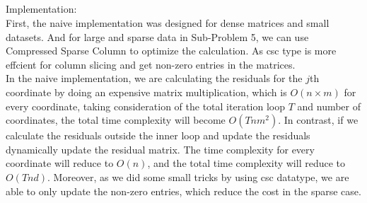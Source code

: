 \documentclass{article}
\begin{document}
\subsection{}
Implementation: \\
First, the naive implementation was designed for dense matrices and small datasets. And for large and sparse data in Sub-Problem 5, we can use Compressed Sparse Column to optimize the calculation. As csc type is more effcient for column slicing and get non-zero entries in the matrices.\\ 
In the naive implementation, we are calculating the residuals for the $ j $th coordinate by doing an expensive matrix multiplication, which is $ O(n\times m) $ for every coordinate, taking consideration of the total iteration loop $ T $ and number of coordinates, the total time complexity will become $ O(Tnm^2) $. In contrast, if we calculate the residuals outside the inner loop and update the residuals dynamically update the residual matrix. The time complexity for every coordinate will reduce to $ O(n) $, and the total time complexity will reduce to $ O(Tnd) $. Moreover, as we did some small tricks by using csc datatype, we are able to only update the non-zero entries, which reduce the cost in the sparse case.\\
\end{document}
